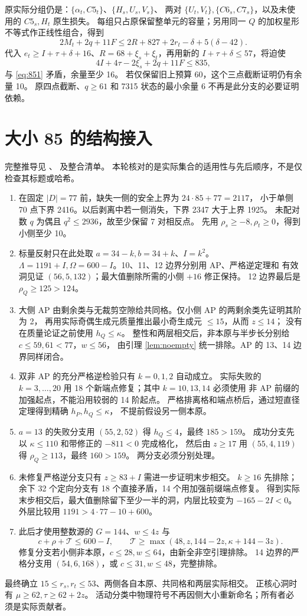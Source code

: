 \documentclass[11pt,a4paper]{article}
\newcommand{\T}{\mathcal T}
\begin{document}
原实际分组仍是：$\{\alpha_t,C5_t\}$、$\{H_s,U_s,V_s\}$、
两对 $\{U_t,V_t\},\{C6_s,C7_s\}$，以及未使用的 $C5_s,H_t$ 原生损失。
每组只占原保留整单元的容量；另用同一 $Q$ 的加权星形不等式作正线性组合，得到
\[
2M_t+2q+11F\le2R+827+2r_t-\delta+5(\delta-42).
\]
代入 $e_t\ge I+\tau+\delta+16$、$R=68+\xi_s+\xi_t$，再用新的
$I+\tau+\delta\le57$，将迫使
\[4I+4\tau-2\xi_s+2q+11F\le835,\]
与 \eqref{eq:851} 矛盾，余量至少 16。
若仅保留旧上预算 60，这个三点截断证明仍有余量 10。
原四点截断、$q\ge61$ 和 7315 状态的最小余量 6 不再是此分支的必要证明依赖。

\section{大小 85 的结构接入}\label{sec:structure}
完整推导见 、
 及整合清单。
本轮核对的是实际集合的适用性与先后顺序，不是仅检查其标题或哈希。

\begin{enumerate}
\item 在固定 $|D|=77$ 前，缺失一侧的安全上界为 $24\cdot85+77=2117$，
小于单侧 70 点下界 2416。以后剥离中若一侧消失，下界 2347 大于上界 1925。
未配对数 $q$ 为偶且 $q^2\le2936$，故至少保留 7 对相反点。
先用 $\rho_s\ge-8,\rho_t\ge0$，得到小侧至少 10。
\item 标量反射只在此处取 $a=34-k,b=34+k$、$I=k^2$。
$\Lambda=1191+I,\Omega=600-I$。10、11、12 边界分别用 AP、严格逆定理和
有效洞见证 $(56,5,132)$；最大值删除所需的小侧 $+16$ 修正保持。
12 边界最后是 $\rho_Q\ge125>124$。
\item 大侧 AP 由剩余类与无裁剪空隙给共同格。仅小侧 AP 的两剩余类先证明其阶为 2，
再用实际奇偶生成元质量推出最小奇生成元 $\le15$，从而 $z\le14$；
没有在质量论证之前使用 $h_Q\le\kappa$。
整性和两层相交后，非本原与半步长分别给 $c\le59,61<77$，$w\le56$，
由引理 \ref{lem:noempty} 统一排除。AP 的 13、14 边界同样闭合。
\item 双非 AP 的充分严格逆检验只有 $k=0,1,2$ 自动成立。
实际失败的 $k=3,\ldots,20$ 用 18 个新端点修复；其中 $k=10,13,14$ 必须使用
非 AP 前缀的加强起点，不能沿用较弱的 14 阶起点。
严格排离格和端点桥后，通过短直径定理得到精确 $h_P,h_Q\le\kappa$，
不提前假设另一侧本原。
\item $a=13$ 的失败分支用 $(55,2,52)$ 得 $h_Q\le4$，最终 $185>159$。
成功分支先以 $\kappa\le110$ 和带修正的 $-811<0$ 完成格化，
然后由 $z\ge17$ 用 $(55,4,119)$ 得 $\rho_Q\ge113$，最终 $160>159$。
两分支必须分别处理。
\item 未修复严格逆分支只有 $z\ge83+I$ 需进一步证明末步相交。
$k\ge16$ 先排除；余下 32 个定向分支有 18 个直接矛盾，14 个用加强前缀端点修复。
得到实际末步相交后，最大值删除留下至少一半的洞，内层比较变为 $-165-2I<0$。
外层比较用 $1191>4\cdot77-10+600$。
\item 此后才使用整数源的 $G=144$、$w\le4z$ 与
\[c+\rho+\T\le600-I,\qquad \T\ge\max(48,z,144-2z,\kappa+144-3z).\]
修复分支若小侧非本原，$c\le28,w\le64$，由新全非空引理排除。
14 边界的严格分支用 $(54,6,168)$，或 $c\le31,w\le48$，完整排除。
\end{enumerate}
最终确立 $15\le r_s,r_t\le53$、两侧各自本原、共同格和两层实际相交。
正核心洞时有 $\mu\ge62,\tau\ge62+2z$。
活动分类中物理符号不再因侧大小重新命名；所有者必须是实际贡献者。
\end{document}
